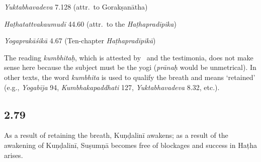 \begin{ekdosis}
\begin{testimonia}[hp02_078]
\emph{Yuktabhavadeva} 7.128 (attr.~to Gorakṣanātha)

\begin{versinnote}
\end{versinnote}

\emph{Haṭhatattvakaumudī} 44.60 (attr.~to the \emph{Haṭhapradīpika})

\begin{versinnote}
\end{versinnote}

\emph{Yogaprakāśikā} 4.67 (Ten-chapter \emph{Haṭhapradīpikā})

\begin{versinnote}
\end{versinnote}
\end{testimonia}

\begin{philcomm}[hp02_078]
The reading \emph{kumbhitaḥ}, which is attested by \alphaOne\ and the testimonia, does not make sense here  %
because the subject must be the yogi (\emph{prānaḥ} would be unmetrical). In other texts, the word \emph{kumbhita} is used to qualify the breath and means `retained' (e.g., \emph{Yogabīja} 94, \emph{Kumbhakapaddhati} 127, \emph{Yuktabhavadeva} 8.32, etc.).
\end{philcomm}

\subsection*{2.79}
\begin{translation}[hp02_079]
As a result of retaining the breath, Kuṇḍalinī awakens; as a result of the awakening of Kuṇḍalinī, Suṣumṇā becomes free of blockages and success in Haṭha arises.
\end{translation}


\end{ekdosis}
